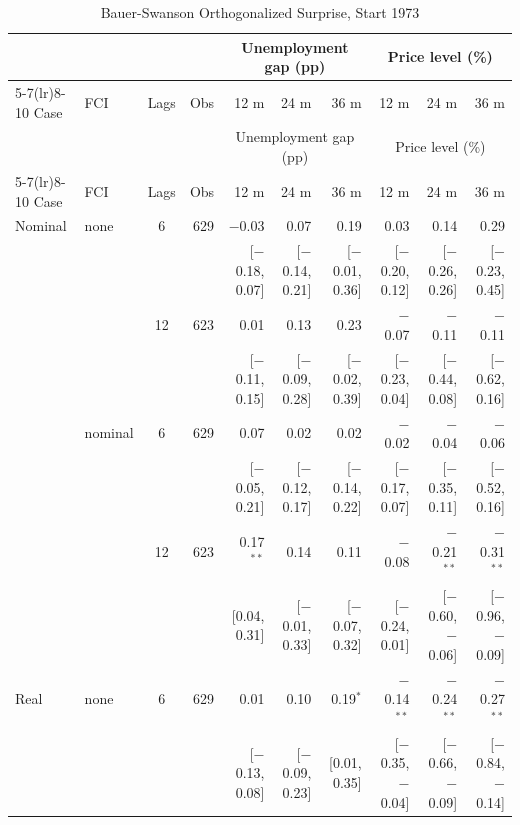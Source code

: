 \begingroup\scriptsize\setlength{\tabcolsep}{0.9pt}
\begin{longtable}{llcrrrrrrr}
\caption{Bauer-Swanson Orthogonalized Surprise, Start 1973}\label{tab:appR373}\\
\toprule
 & & & & \multicolumn{3}{c}{Unemployment gap (pp)} & \multicolumn{3}{c}{Price level (\%)}\\ \cmidrule(lr){5-7}\cmidrule(lr){8-10}
Case & FCI & Lags & Obs & 12 m & 24 m & 36 m & 12 m & 24 m & 36 m\\
\midrule\endfirsthead
\toprule
 & & & & \multicolumn{3}{c}{Unemployment gap (pp)} & \multicolumn{3}{c}{Price level (\%)}\\ \cmidrule(lr){5-7}\cmidrule(lr){8-10}
Case & FCI & Lags & Obs & 12 m & 24 m & 36 m & 12 m & 24 m & 36 m\\
\midrule\endhead
\bottomrule\endfoot
Nominal & none & 6 & 629 & $-$0.03 & 0.07 & 0.19 & 0.03 & 0.14 & 0.29\\
 & & & & {\scriptsize [$-$0.18, 0.07]} & {\scriptsize [$-$0.14, 0.21]} & {\scriptsize [$-$0.01, 0.36]} & {\scriptsize [$-$0.20, 0.12]} & {\scriptsize [$-$0.26, 0.26]} & {\scriptsize [$-$0.23, 0.45]}\\
 &  & 12 & 623 & 0.01 & 0.13 & 0.23 & $-$0.07 & $-$0.11 & $-$0.11\\
 & & & & {\scriptsize [$-$0.11, 0.15]} & {\scriptsize [$-$0.09, 0.28]} & {\scriptsize [$-$0.02, 0.39]} & {\scriptsize [$-$0.23, 0.04]} & {\scriptsize [$-$0.44, 0.08]} & {\scriptsize [$-$0.62, 0.16]}\\
 & nominal & 6 & 629 & 0.07 & 0.02 & 0.02 & $-$0.02 & $-$0.04 & $-$0.06\\
 & & & & {\scriptsize [$-$0.05, 0.21]} & {\scriptsize [$-$0.12, 0.17]} & {\scriptsize [$-$0.14, 0.22]} & {\scriptsize [$-$0.17, 0.07]} & {\scriptsize [$-$0.35, 0.11]} & {\scriptsize [$-$0.52, 0.16]}\\
 &  & 12 & 623 & 0.17$^{**}$ & 0.14 & 0.11 & $-$0.08 & $-$0.21$^{**}$ & $-$0.31$^{**}$\\
 & & & & {\scriptsize [0.04, 0.31]} & {\scriptsize [$-$0.01, 0.33]} & {\scriptsize [$-$0.07, 0.32]} & {\scriptsize [$-$0.24, 0.01]} & {\scriptsize [$-$0.60, $-$0.06]} & {\scriptsize [$-$0.96, $-$0.09]}\\
\addlinespace
Real & none & 6 & 629 & 0.01 & 0.10 & 0.19$^{*}$ & $-$0.14$^{**}$ & $-$0.24$^{**}$ & $-$0.27$^{**}$\\
 & & & & {\scriptsize [$-$0.13, 0.08]} & {\scriptsize [$-$0.09, 0.23]} & {\scriptsize [0.01, 0.35]} & {\scriptsize [$-$0.35, $-$0.04]} & {\scriptsize [$-$0.66, $-$0.09]} & {\scriptsize [$-$0.84, $-$0.14]}\\

\end{longtable}
